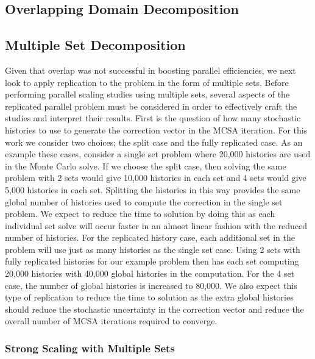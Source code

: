 \clearpage

\subsection{Overlapping Domain Decomposition}
\label{subsec:overlapping_domain_decomp}

\clearpage

\subsection{Multiple Set Decomposition}
\label{subsec:msod_decomposition}

Given that overlap was not successful in boosting parallel
efficiencies, we next look to apply replication to the problem in the
form of multiple sets. Before performing parallel scaling studies
using multiple sets, several aspects of the replicated parallel
problem must be considered in order to effectively craft the studies
and interpret their results. First is the question of how many
stochastic histories to use to generate the correction vector in the
MCSA iteration. For this work we consider two choices; the split case
and the fully replicated case. As an example these cases, consider a
single set problem where 20,000 histories are used in the Monte Carlo
solve. If we choose the split case, then solving the same problem with
2 sets would give 10,000 histories in each set and 4 sets would give
5,000 histories in each set. Splitting the histories in this way
provides the same global number of histories used to compute the
correction in the single set problem. We expect to reduce the time to
solution by doing this as each individual set solve will occur faster
in an almost linear fashion with the reduced number of histories. For
the replicated history case, each additional set in the problem will
use just as many histories as the single set case. Using 2 sets with
fully replicated histories for our example problem then has each set
computing 20,000 histories with 40,000 global histories in the
computation. For the 4 set case, the number of global histories is
increased to 80,000. We also expect this type of replication to reduce
the time to solution as the extra global histories should reduce the
stochastic uncertainty in the correction vector and reduce the overall
number of MCSA iterations required to converge.

\subsubsection{Strong Scaling with Multiple Sets}
\label{subsubsec:ms_strong}

